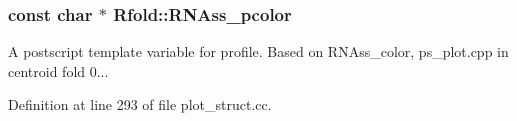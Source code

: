 \hypertarget{namespace_rfold_a93184d47abea6b1f0ece81e3c4cb7de0}{
\subsubsection[{R\+N\+Ass\+\_\+pcolor}]{\setlength{\rightskip}{0pt plus 5cm}const char $\ast$ Rfold\+::\+R\+N\+Ass\+\_\+pcolor}}\label{namespace_rfold_a93184d47abea6b1f0ece81e3c4cb7de0}
A postscript template variable for profile. Based on R\+N\+Ass\+\_\+color, ps\+\_\+plot.\+cpp in centroid fold 0... 

Definition at line 293 of file plot\+\_\+struct.\+cc.

